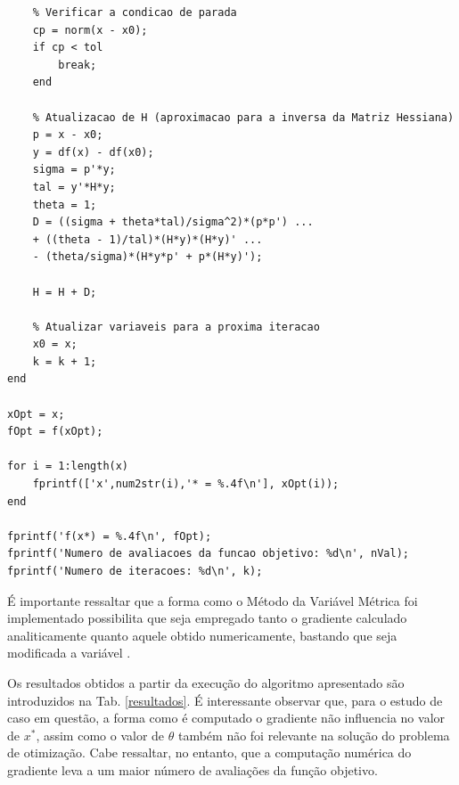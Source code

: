 \documentclass[12pt]{article}
\begin{document}
\begin{lstlisting}
	% Verificar a condicao de parada
	cp = norm(x - x0);
	if cp < tol
		break;
	end
	
	% Atualizacao de H (aproximacao para a inversa da Matriz Hessiana)
	p = x - x0;
	y = df(x) - df(x0);
	sigma = p'*y;
	tal = y'*H*y;
	theta = 1;
	D = ((sigma + theta*tal)/sigma^2)*(p*p') ...
	+ ((theta - 1)/tal)*(H*y)*(H*y)' ...
	- (theta/sigma)*(H*y*p' + p*(H*y)');
	
	H = H + D;
	
	% Atualizar variaveis para a proxima iteracao
	x0 = x;
	k = k + 1;
end

xOpt = x;
fOpt = f(xOpt);

for i = 1:length(x)
	fprintf(['x',num2str(i),'* = %.4f\n'], xOpt(i));
end

fprintf('f(x*) = %.4f\n', fOpt);
fprintf('Numero de avaliacoes da funcao objetivo: %d\n', nVal);
fprintf('Numero de iteracoes: %d\n', k);
		\end{lstlisting} 
	
	\vspace{0.4cm}
	É importante ressaltar que a forma como o Método da Variável Métrica foi implementado possibilita que seja empregado tanto o gradiente calculado analiticamente quanto aquele obtido numericamente, bastando que seja modificada a variável .
	
	Os resultados obtidos a partir da execução do algoritmo apresentado são introduzidos na Tab. \ref{resultados}. É interessante observar que, para o estudo de caso em questão, a forma como é computado o gradiente não influencia no valor de $ x^* $, assim como o valor de $ \theta $ também não foi relevante na solução do problema de otimização. Cabe ressaltar, no entanto, que a computação numérica do gradiente leva a um maior número de avaliações da função objetivo. 
	
\end{document}
